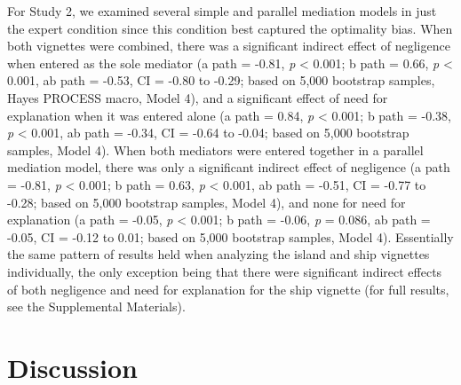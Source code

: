 \documentclass[
  man,floatsintext]{apa6}
\begin{document}
For Study 2, we examined several simple and parallel mediation models in just the expert condition since this condition best captured the optimality bias. When both vignettes were combined, there was a significant indirect effect of negligence when entered as the sole mediator (a path = -0.81, \emph{p} \textless{} 0.001; b path = 0.66, \emph{p} \textless{} 0.001, ab path = -0.53, CI = -0.80 to -0.29; based on 5,000 bootstrap samples, Hayes PROCESS macro, Model 4), and a significant effect of need for explanation when it was entered alone (a path = 0.84, \emph{p} \textless{} 0.001; b path = -0.38, \emph{p} \textless{} 0.001, ab path = -0.34, CI = -0.64 to -0.04; based on 5,000 bootstrap samples, Model 4). When both mediators were entered together in a parallel mediation model, there was only a significant indirect effect of negligence (a path = -0.81, \emph{p} \textless{} 0.001; b path = 0.63, \emph{p} \textless{} 0.001, ab path = -0.51, CI = -0.77 to -0.28; based on 5,000 bootstrap samples, Model 4), and none for need for explanation (a path = -0.05, \emph{p} \textless{} 0.001; b path = -0.06, \emph{p} = 0.086, ab path = -0.05, CI = -0.12 to 0.01; based on 5,000 bootstrap samples, Model 4). Essentially the same pattern of results held when analyzing the island and ship vignettes individually, the only exception being that there were significant indirect effects of both negligence and need for explanation for the ship vignette (for full results, see the Supplemental Materials).

\hypertarget{discussion}{%
\section{Discussion}\label{discussion}}
\end{document}
